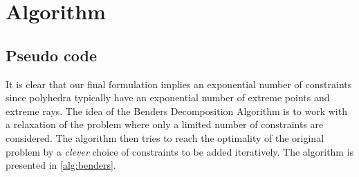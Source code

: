 \section{Algorithm}

\subsection{Pseudo code}

It is clear that our final formulation implies an exponential number of constraints since polyhedra typically have an exponential number of extreme points and extreme rays. The idea of the Benders Decomposition Algorithm is to work with a relaxation of the problem where only a limited number of constraints are considered. The algorithm then tries to reach the optimality of the original problem by a \textit{clever} choice of constraints to be added iteratively. The algorithm is presented in \ref{alg:benders}. 
